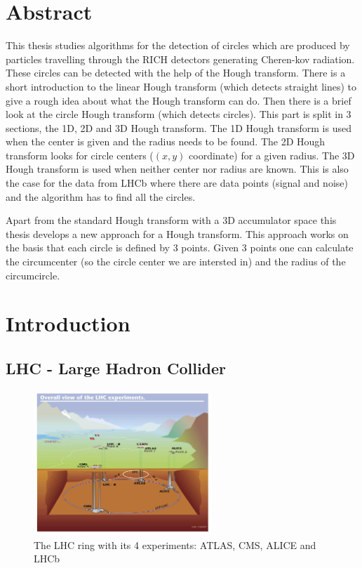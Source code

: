 \documentclass[11pt,twoside]{scrreprt}
\begin{document}
\chapter*{Abstract}
This thesis studies algorithms for the detection of circles which are produced by particles travelling through the RICH detectors generating Cheren-kov radiation.
These circles can be detected with the help of the Hough transform. There is a short introduction to the linear Hough transform (which detects straight lines) to give a rough idea about what the Hough transform can do. Then there is a brief look at the circle Hough transform (which detects circles). This part is split in 3 sections, the 1D, 2D and 3D Hough transform. The 1D Hough transform is used when the center is given and the radius needs to be found. The 2D Hough transform looks for circle centers ($(x,y)$ coordinate) for a given radius. The
3D Hough transform is used when neither center nor radius are known. This is also the case for the data from LHCb where there are data points (signal and noise) and the algorithm has to find all the circles.

Apart from the standard Hough transform with a 3D accumulator space this thesis develops a new approach for a Hough transform. This approach works on the basis that each circle is defined by 3 points. Given 3 points one can calculate the circumcenter (so the circle center we are intersted in) and the radius of the circumcircle.

\tableofcontents
\listoftables
\listoffigures	

\chapter{Introduction}
\section{LHC - Large Hadron Collider} %
\label{sec:lhc_large_hadron_collider}
\begin{figure}[b]
  \centering
  \includegraphics[width=0.6\textwidth]{pics/lhc}
  \caption{The LHC ring with its 4 experiments: ATLAS, CMS, ALICE and LHCb}
  \label{fig:lhc}
\end{figure}
\end{document}
